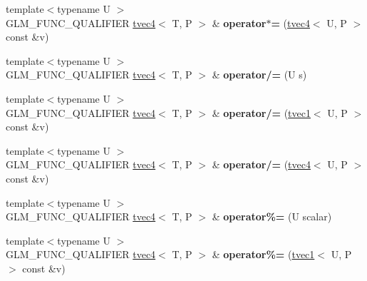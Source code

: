 \begin{DoxyCompactItemize}
\item 
\hypertarget{structglm_1_1tvec4_a6746eded03379870b12de89276141991}{{\footnotesize template$<$typename U $>$ }\\G\-L\-M\-\_\-\-F\-U\-N\-C\-\_\-\-Q\-U\-A\-L\-I\-F\-I\-E\-R \hyperlink{structglm_1_1tvec4}{tvec4}$<$ T, P $>$ \& {\bfseries operator$\ast$=} (\hyperlink{structglm_1_1tvec4}{tvec4}$<$ U, P $>$ const \&v)}\label{structglm_1_1tvec4_a6746eded03379870b12de89276141991}

\item 
\hypertarget{structglm_1_1tvec4_a4f454ad0f6ae1b63a85adec36ee2ad9b}{{\footnotesize template$<$typename U $>$ }\\G\-L\-M\-\_\-\-F\-U\-N\-C\-\_\-\-Q\-U\-A\-L\-I\-F\-I\-E\-R \hyperlink{structglm_1_1tvec4}{tvec4}$<$ T, P $>$ \& {\bfseries operator/=} (U s)}\label{structglm_1_1tvec4_a4f454ad0f6ae1b63a85adec36ee2ad9b}

\item 
\hypertarget{structglm_1_1tvec4_a75fde6792f702029d92cfb3502a7e8ea}{{\footnotesize template$<$typename U $>$ }\\G\-L\-M\-\_\-\-F\-U\-N\-C\-\_\-\-Q\-U\-A\-L\-I\-F\-I\-E\-R \hyperlink{structglm_1_1tvec4}{tvec4}$<$ T, P $>$ \& {\bfseries operator/=} (\hyperlink{structglm_1_1tvec1}{tvec1}$<$ U, P $>$ const \&v)}\label{structglm_1_1tvec4_a75fde6792f702029d92cfb3502a7e8ea}

\item 
\hypertarget{structglm_1_1tvec4_accd622c14fd14f612f8cb52e1d669163}{{\footnotesize template$<$typename U $>$ }\\G\-L\-M\-\_\-\-F\-U\-N\-C\-\_\-\-Q\-U\-A\-L\-I\-F\-I\-E\-R \hyperlink{structglm_1_1tvec4}{tvec4}$<$ T, P $>$ \& {\bfseries operator/=} (\hyperlink{structglm_1_1tvec4}{tvec4}$<$ U, P $>$ const \&v)}\label{structglm_1_1tvec4_accd622c14fd14f612f8cb52e1d669163}

\item 
\hypertarget{structglm_1_1tvec4_af438ebaf22a88b79e0db2a23738f6bb3}{{\footnotesize template$<$typename U $>$ }\\G\-L\-M\-\_\-\-F\-U\-N\-C\-\_\-\-Q\-U\-A\-L\-I\-F\-I\-E\-R \hyperlink{structglm_1_1tvec4}{tvec4}$<$ T, P $>$ \& {\bfseries operator\%=} (U scalar)}\label{structglm_1_1tvec4_af438ebaf22a88b79e0db2a23738f6bb3}

\item 
\hypertarget{structglm_1_1tvec4_abf42924fdc633b087a0bb2d91830fbce}{{\footnotesize template$<$typename U $>$ }\\G\-L\-M\-\_\-\-F\-U\-N\-C\-\_\-\-Q\-U\-A\-L\-I\-F\-I\-E\-R \hyperlink{structglm_1_1tvec4}{tvec4}$<$ T, P $>$ \& {\bfseries operator\%=} (\hyperlink{structglm_1_1tvec1}{tvec1}$<$ U, P $>$ const \&v)}\label{structglm_1_1tvec4_abf42924fdc633b087a0bb2d91830fbce}


\end{DoxyCompactItemize}
